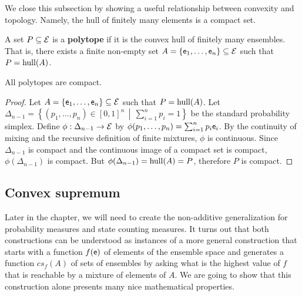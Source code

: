 We close this subsection by showing a useful relationship between convexity and topology. Namely, the hull of finitely many elements is a compact set.

\begin{mathSection}
\begin{defn}[Polytope]
	A set $P \subseteq \mathcal{E}$ is a \textbf{polytope} if it is the convex hull of finitely many ensembles. That is, there exists a finite non-empty set $A=\{\mathsf{e}_1,\dots,\mathsf{e}_n\}\subseteq\mathcal{E}$ such that $P = \mathrm{hull}(A)$.
\end{defn}

\begin{prop}
	All polytopes are compact.
\end{prop}

\begin{proof}
	Let $A=\{\mathsf{e}_1,\dots,\mathsf{e}_n\}\subseteq\mathcal{E}$ such that $P = \mathrm{hull}(A)$. Let $\Delta_{n-1}=\left\{(p_1,\dots,p_n)\in[0,1]^n \,\middle|\, \sum_{i=1}^n p_i=1\right\}$ be the standard probability simplex. Define $\phi:\Delta_{n-1}\to\mathcal{E}$ by $\phi(p_1,\dots,p_n)=\sum_{i=1}^n p_i\mathsf{e}_i$. By the continuity of mixing and the recursive definition of finite mixtures, $\phi$ is continuous. Since $\Delta_{n-1}$ is compact and the continuous image of a compact set is compact, $\phi(\Delta_{n-1})$ is compact. But $\phi(\Delta_{n-1})=\mathrm{hull}(A)=P$, therefore $P$ is compact.
\end{proof}
\end{mathSection}

\subsection{Convex supremum}

Later in the chapter, we will need to create the non-additive generalization for probability measures and state counting measures. It turns out that both constructions can be understood as instances of a more general construction that starts with a function $f(\mathsf{e})$ of elements of the ensemble space and generates a function $cs_f(A)$ of sets of ensembles by asking what is the highest value of $f$ that is reachable by a mixture of elements of $A$. We are going to show that this construction alone presents many nice mathematical properties.

